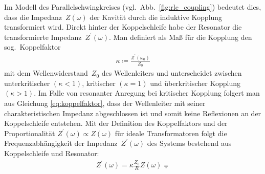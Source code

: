 Im Modell des Parallelschwingkreises (vgl.\ Abb.\ \ref{fig:rlc_coupling}) bedeutet dies, dass die Impedanz~$Z(\omega)$ der Kavität durch die induktive Kopplung transformiert wird.
Direkt hinter der Koppelschleife habe der Resonator die transformierte Impedanz~$Z^\prime(\omega)$.
Man definiert als Maß für die Kopplung den sog.\ Koppelfaktor
\begin{align}
  \kappa \coloneqq \frac{Z^\prime(\omega_0)}{Z_0}
  \label{eq:koppelfaktor}
\end{align}
mit dem Wellenwiderstand~$Z_0$ des Wellenleiters und unterscheidet zwischen unterkritischer $(\kappa < 1)$, kritischer $(\kappa = 1)$ und überkritischer Kopplung $(\kappa > 1)$.
Im Falle von resonanter Anregung bei kritischer Kopplung folgert man aus Gleichung \eqref{eq:koppelfaktor}, dass der Wellenleiter mit seiner charakteristischen Impedanz abgeschlossen ist und somit keine Reflexionen an der Koppelschleife entstehen.
Mit der Definition des Koppelfaktors und der Proportionalität $Z^\prime(\omega) \propto Z(\omega)$ für ideale Transformatoren folgt die Frequenzabhängigkeit der Impedanz~$Z^\prime(\omega)$ des Systems bestehend aus Koppelschleife und Resonator:
\begin{align}
  Z^\prime(\omega) = \kappa \frac{Z_0}{R} Z(\omega) \eqdot
  \label{eq:impedanz_hinter_schleife}
\end{align}

